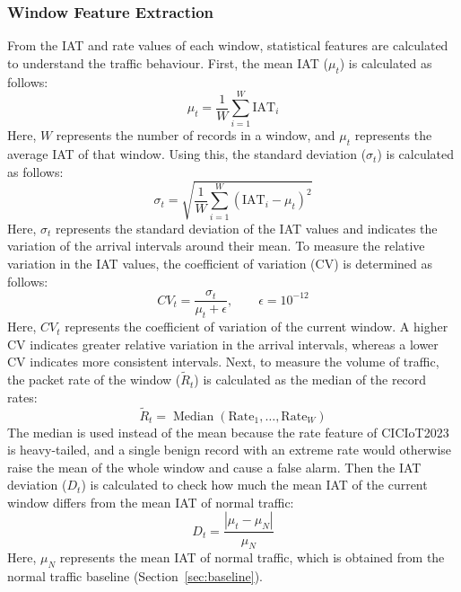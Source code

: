 \documentclass[]{interact}
\theoremstyle{plain}%
\theoremstyle{definition}
\theoremstyle{remark}
\begin{document}
\subsubsection{Window Feature Extraction}
From the IAT and rate values of each window, statistical features are calculated to understand the traffic behaviour. First, the mean IAT ($\mu_t$) is calculated as follows:
\begin{equation}
  \mu_t = \frac{1}{W}\sum_{i=1}^{W}\mathrm{IAT}_i
\end{equation}
Here, $W$ represents the number of records in a window, and $\mu_t$ represents the average IAT of that window. Using this, the standard deviation ($\sigma_t$) is calculated as follows:
\begin{equation}
  \sigma_t = \sqrt{\frac{1}{W}\sum_{i=1}^{W}\left(\mathrm{IAT}_i-\mu_t\right)^2}
\end{equation}
Here, $\sigma_t$ represents the standard deviation of the IAT values and indicates the variation of the arrival intervals around their mean. To measure the relative variation in the IAT values, the coefficient of variation (CV) is determined as follows:
\begin{equation}
  CV_t = \frac{\sigma_t}{\mu_t + \epsilon}, \qquad \epsilon = 10^{-12}
\end{equation}
Here, $CV_t$ represents the coefficient of variation of the current window. A higher CV indicates greater relative variation in the arrival intervals, whereas a lower CV indicates more consistent intervals. Next, to measure the volume of traffic, the packet rate of the window ($\tilde{R}_t$) is calculated as the median of the record rates:
\begin{equation}
  \tilde{R}_t = \operatorname{Median}\left(\mathrm{Rate}_1, \ldots, \mathrm{Rate}_W\right)
\end{equation}
The median is used instead of the mean because the rate feature of CICIoT2023 is heavy-tailed, and a single benign record with an extreme rate would otherwise raise the mean of the whole window and cause a false alarm. Then the IAT deviation ($D_t$) is calculated to check how much the mean IAT of the current window differs from the mean IAT of normal traffic:
\begin{equation}
  D_t = \frac{\left|\mu_t-\mu_{N}\right|}{\mu_{N}}
\end{equation}
Here, $\mu_N$ represents the mean IAT of normal traffic, which is obtained from the normal traffic baseline (Section~\ref{sec:baseline}).
\end{document}
